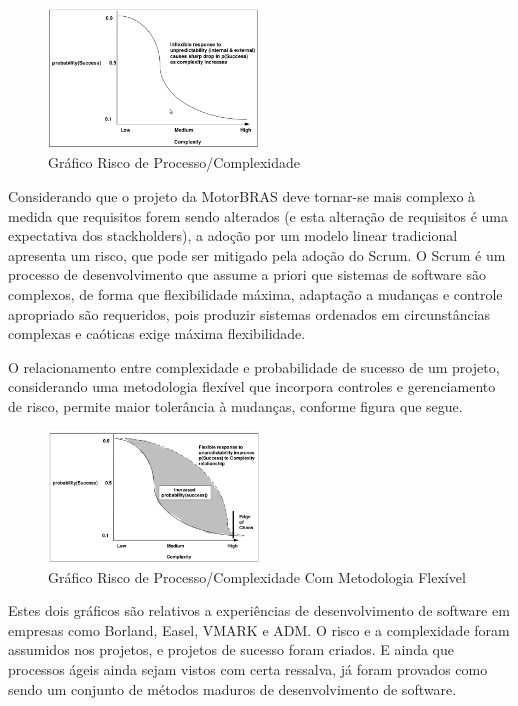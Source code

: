 \documentclass[12pt,journal,compsoc]{IEEEtran}
\begin{document}
\begin{figure}[ht!]
\centering
\includegraphics[width=0.5\textwidth]{scrum_risk_complexity_graph}
\caption{Gráfico Risco de Processo/Complexidade \cite{scrum_development_process}}
\label{fig:scrum_risk_complexity_graph}
\end{figure}

Considerando que o projeto da MotorBRAS deve tornar-se mais complexo à medida que requisitos forem sendo alterados (e esta alteração de requisitos é uma expectativa dos stackholders), a adoção por um modelo linear tradicional apresenta um risco, que pode ser mitigado pela adoção do Scrum. O Scrum é um processo de desenvolvimento que assume a priori que sistemas de software são complexos, de forma que flexibilidade máxima, adaptação a mudanças e controle apropriado são requeridos, pois produzir sistemas ordenados em circunstâncias complexas e caóticas exige máxima flexibilidade. \cite{scrum_development_process} 

O relacionamento entre complexidade e probabilidade de sucesso de um projeto, considerando uma metodologia flexível que incorpora controles e gerenciamento de risco, permite maior tolerância à mudanças, conforme figura que segue. 

\begin{figure}[ht!]
\centering
\includegraphics[width=0.5\textwidth]{scrum_risk_complexity_graph_02}
\caption{Gráfico Risco de Processo/Complexidade Com Metodologia Flexível \cite{scrum_development_process}}
\label{fig:scrum_risk_complexity_graph_02}
\end{figure}

Estes dois gráficos são relativos a experiências de desenvolvimento de software em empresas como Borland, Easel, VMARK e ADM. O risco e a complexidade foram assumidos nos projetos, e projetos de sucesso foram criados. E ainda que processos ágeis ainda sejam vistos com certa ressalva, já foram provados como sendo um conjunto de métodos maduros de desenvolvimento de software. \cite{agile_meth_hype_reality}
\end{document}
